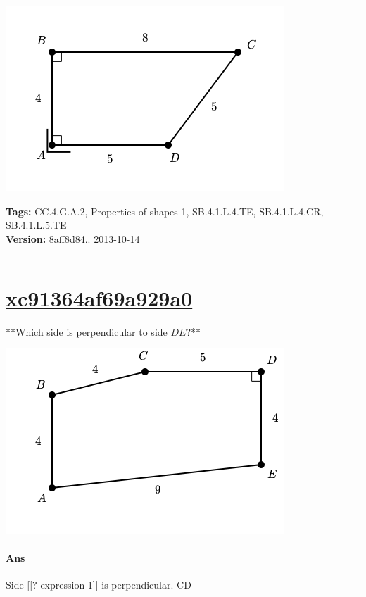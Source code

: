 \documentclass[twocolumn,10pt]{article}
\def\shrinkfactor{0.55}
\begin{document}
\includegraphics[scale=\shrinkfactor]{figures/9b7dfefa037b648abfb4816b1dff8de898e30b36.png}



\medskip
\noindent
\textbf{Tags:} {\footnotesize CC.4.G.A.2, Properties of shapes 1, SB.4.1.L.4.TE, SB.4.1.L.4.CR, SB.4.1.L.5.TE}\\
\textbf{Version:} 8aff8d84.. 2013-10-14
\smallskip\hrule





\section{\href{https://www.khanacademy.org/devadmin/content/items/xc91364af69a929a0}{xc91364af69a929a0}}

\noindent
**Which side is perpendicular to side $\overline{DE}$?**

\includegraphics[scale=\shrinkfactor]{figures/3a5627b228409ceef6d5626dd0a440d65e019442.png}

\paragraph{Ans} Side  [[? expression 1]] is perpendicular.
  CD
\end{document}
